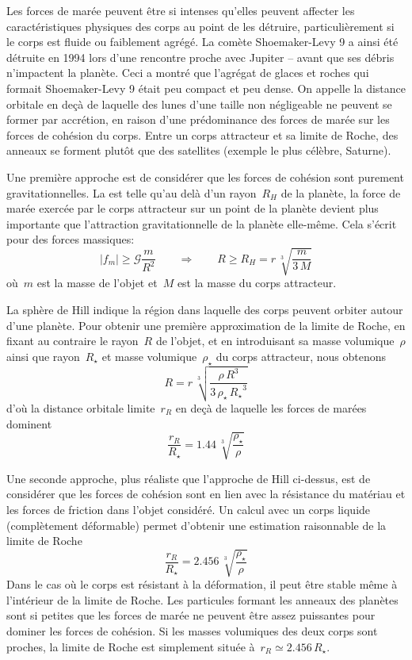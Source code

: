 \sk
Les forces de marée peuvent être si intenses qu'elles peuvent affecter les caractéristiques physiques des corps au point de les détruire, particulièrement si le corps est fluide ou faiblement agrégé. La comète Shoemaker-Levy 9 a ainsi été détruite en 1994 lors d'une rencontre proche avec Jupiter -- avant que ses débris n'impactent la planète. Ceci a montré que l'agrégat de glaces et roches qui formait Shoemaker-Levy 9 était peu compact et peu dense. On appelle  la distance orbitale en deçà de laquelle des lunes d'une taille non négligeable ne peuvent se former par accrétion, en raison d'une prédominance des forces de marée sur les forces de cohésion du corps. Entre un corps attracteur et sa limite de Roche, des anneaux se forment plutôt que des satellites (exemple le plus célèbre, Saturne).

\sk
Une première approche est de considérer que les forces de cohésion sont purement gravitationnelles. La  est telle qu'au delà d'un rayon~$R_H$ de la planète, la force de marée exercée par le corps attracteur sur un point de la planète devient plus importante que l'attraction gravitationnelle de la planète elle-même. Cela s'écrit pour des forces massiques:
\[ |f_m| \geq \mathcal{G} \frac{m}{R^2} \qquad \Rightarrow \qquad R \geq R_H = r \, \sqrt[3]{ \frac{m}{3\,M} } \]
\noindent où~$m$ est la masse de l'objet et~$M$ est la masse du corps attracteur.

\sk
La sphère de Hill indique la région dans laquelle des corps peuvent orbiter autour d'une planète. Pour obtenir une première approximation de la limite de Roche, en fixant au contraire le rayon~$R$ de l'objet, et en introduisant sa masse volumique~$\rho$ ainsi que rayon~$R_{\star}$ et masse volumique~$\rho_{\star}$ du corps attracteur, nous obtenons
\[ R = r \, \sqrt[3]{ \frac{\rho \, R^3}{3\, \rho_{\star} \, {R_{\star}}^3} } \]
d'où la distance orbitale limite~$r_R$ en deçà de laquelle les forces de marées dominent
\[ \frac{r_R}{R_{\star}} = 1.44 \, \sqrt[3]{ \frac{\rho_{\star}}{\rho} } \]

\sk
Une seconde approche, plus réaliste que l'approche de Hill ci-dessus, est de considérer que les forces de cohésion sont en lien avec la résistance du matériau et les forces de friction dans l'objet considéré. Un calcul avec un corps liquide (complètement déformable) permet d'obtenir une estimation raisonnable de la limite de Roche
\[ \frac{r_R}{R_{\star}} = 2.456 \, \sqrt[3]{ \frac{\rho_{\star}}{\rho} } \]
\noindent Dans le cas où le corps est résistant à la déformation, il peut être stable même à l'intérieur de la limite de Roche. Les particules formant les anneaux des planètes sont si petites que les forces de marée ne peuvent être assez puissantes pour dominer les forces de cohésion. Si les masses volumiques des deux corps sont proches, la limite de Roche est simplement située à~$r_R \simeq 2.456 \, R_{\star}$.

